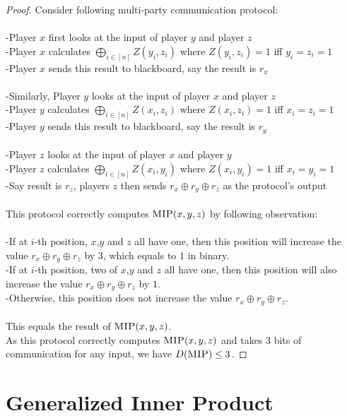 \documentclass[11pt,oneside]{book}
\theoremstyle{plain}
\theoremstyle{definition}
\theoremstyle{plain}
\newcommand{\MIP}{\textsc{MIP}}
\begin{document}
	\begin{proof}
		Consider following multi-party communication protocol:\\
		\\
		-Player $x$ first looks at the input of player $y$ and player $z$\\
		-Player $x$ calculates $\bigoplus_{i \in [n]} Z(y_i,z_i)$ where $Z(y_i,z_i) = 1$ iff $y_i = z_i = 1$\\
		-Player $x$ sends this result to blackboard, say the result is $r_x$ \\
		\\
		-Similarly, Player $y$ looks at the input of player $x$ and player $z$\\
		-Player $y$ calculates $\bigoplus_{i \in [n]} Z(x_i,z_i)$ where $Z(x_i,z_i) = 1$ iff $x_i = z_i = 1$\\
		-Player $y$ sends this result to blackboard, say the result is $r_y$ \\
		\\
		-Player $z$ looks at the input of player $x$ and player $y$\\
		-Player $z$ calculates $\bigoplus_{i \in [n]} Z(x_i,y_i)$ where $Z(x_i,y_i) = 1$ iff $x_i = y_i = 1$\\
		-Say result is $r_z$, players $z$ then sends $r_x \oplus r_y \oplus r_z$ as the protocol's output \\
		\\
		This protocol correctly computes $\MIP(x,y,z)$ by following observation:\\
		\\
		-If at $i$-th position, $x$,$y$ and $z$ all have one, then this position will increase the value $r_x \oplus r_y \oplus r_z$ by $3$, which equals to $1$ in binary.\\
		-If at $i$-th position, two of $x$,$y$ and $z$ all have one,  then this position will also increase the value $r_x \oplus r_y \oplus r_z$ by $1$.\\
		-Otherwise, this position does not increase the value $r_x \oplus r_y \oplus r_z$.\\
		\\
		This equals the result of $\MIP(x,y,z)$. \\
		As this protocol correctly computes $\MIP(x,y,z)$ and takes $3$ bits of communication for any input, we have  $D(\MIP) \le 3$. 
	\end{proof}
	
	
	 
	\section{Generalized Inner Product}
	
\end{document}
